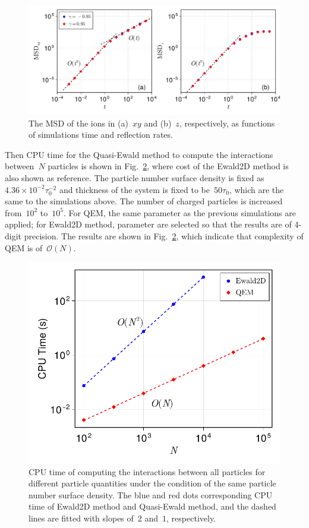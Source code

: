 \begin{figure}[htbp]
    \centering
    \includegraphics[width = 1.0 \linewidth]{figs/msd.pdf}
    \caption{
        The MSD of the ions in (a)~$xy$ and (b)~$z$, respectively, as functions of simulations time and reflection rates.
    }
    \label{fig:msd}
\end{figure}

Then CPU time for the Quasi-Ewald method to compute the interactions between~$N$ particles is shown in Fig.~\ref{fig:timecost}, where cost of the Ewald2D method is also shown as reference.
The particle number surface density is fixed as~$4.36 \times 10^{-2} \tau_0^{-2}$ and thickness of the system is fixed to be~$50 \tau_0$, which are the same to the simulations above.
The number of charged particles is increased from~$10^2$ to~$10^5$.
For QEM, the same parameter as the previous simulations are applied; for Ewald2D method, parameter are selected so that the results are of 4-digit precision.
The results are shown in Fig.~\ref{fig:timecost}, which indicate that complexity of QEM is of~$\mathcal{O}(N)$.

\begin{figure}[htb]
    \centering
    \includegraphics[width = 0.625\linewidth]{figs/runtime.pdf}
    \caption{
    CPU time of computing the interactions between all particles for different particle quantities under the condition of the same particle number surface density.
    The blue and red dots corresponding CPU time of Ewald2D method and Quasi-Ewald method, and the dashed lines are fitted with slopes of~$2$ and~$1$, respectively.
    }
    \label{fig:timecost}
\end{figure}

